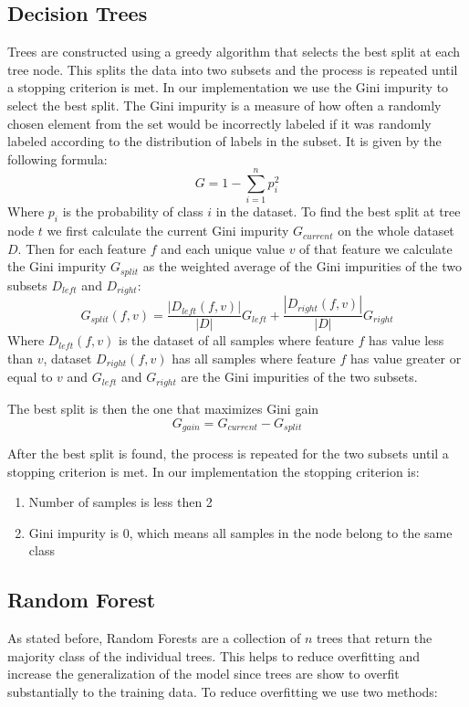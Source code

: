 \documentclass[fleqn,moreauthors,10pt]{ds_report}
\begin{document}
\subsection*{Decision Trees}
Trees are constructed using a greedy algorithm that selects the best split at each tree node.
This splits the data into two subsets and the process is repeated until a stopping criterion is met.
In our implementation we use the Gini impurity to select the best split.
The Gini impurity is a measure of how often a randomly chosen element from the set would be incorrectly labeled if it was randomly labeled according to the distribution of labels in the subset.
It is given by the following formula:
\begin{equation}
	G = 1 - \sum_{i=1}^{n} p_i^2
\end{equation}
Where $p_i$ is the probability of class $i$ in the dataset.
To find the best split at tree node $t$ we first calculate the current Gini impurity $G_{current}$ on the whole dataset $D$.
Then for each feature $f$ and each unique value $v$ of that feature we calculate the Gini impurity $G_{split}$ as the weighted average of the Gini impurities of the two subsets $D_{left}$ and $D_{right}$:
\begin{equation}
	G_{split}(f, v) = \frac{|D_{left}(f, v)|}{|D|} G_{left} + \frac{|D_{right}(f,v)|}{|D|} G_{right}
\end{equation}
Where $D_{left}(f, v)$ is the dataset of all samples where feature $f$ has value less than $v$, dataset $D_{right}(f, v)$ has all samples where feature $f$ has value greater or equal to $v$ and $G_{left}$ and $G_{right}$ are the Gini impurities of the two subsets.

The best split is then the one that maximizes Gini gain 
\begin{equation}
	G_{gain} = G_{current} - G_{split}
\end{equation}

After the best split is found, the process is repeated for the two subsets until a stopping criterion is met.
In our implementation the stopping criterion is:
\begin{enumerate}
	\itemsep-1mm 
	\item Number of samples is less then 2
	\item Gini impurity is 0, which means all samples in the node belong to the same class
\end{enumerate}

\subsection*{Random Forest}
As stated before, Random Forests are a collection of $n$ trees that return the majority class of the individual trees.
This helps to reduce overfitting and increase the generalization of the model since trees are show to overfit substantially to the training data.
To reduce overfitting we use two methods:
\end{document}
